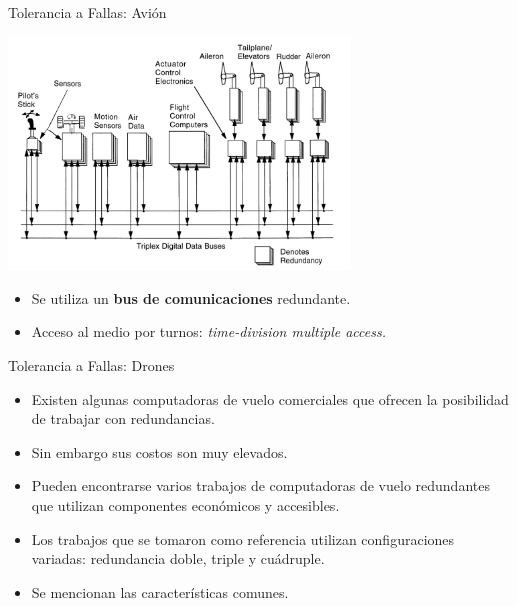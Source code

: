 \begin{frame}{Tolerancia a Fallas: Avión}
	\begin{center}
		\includegraphics[width=0.68\textwidth]{img/diagrama_general_fly_by_wire.png}
	\end{center}
	\begin{itemize}
		\item Se utiliza un \textbf{bus de comunicaciones} redundante.
		\item Acceso al medio por turnos: \textit{time-division multiple access.}
	\end{itemize}
\end{frame}

\begin{frame}{Tolerancia a Fallas: Drones}
	\begin{itemize}
		\item Existen algunas computadoras de vuelo comerciales que ofrecen la posibilidad de trabajar con redundancias.
		\item Sin embargo sus costos son muy elevados.
		\item Pueden encontrarse varios trabajos de computadoras de vuelo redundantes que utilizan componentes económicos y accesibles.
		\item Los trabajos que se tomaron como referencia utilizan configuraciones variadas: redundancia doble, triple y cuádruple.
		\item Se mencionan las características comunes.
	\end{itemize}
\end{frame}

